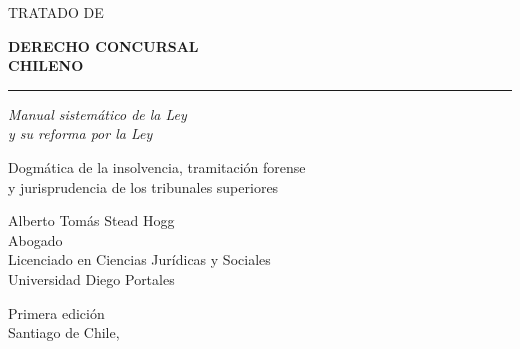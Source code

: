 \begin{titlingpage}
\begin{center}
\vspace*{2.2cm}

{\sffamily\large\color{ColorGris} TRATADO DE}

\vspace{0.4cm}
{\sffamily\HUGE\bfseries\color{ColorTinta} DERECHO CONCURSAL\\[6pt] CHILENO}

\vspace{0.9cm}
{\color{ColorBorde}\rule{0.62\textwidth}{0.8pt}}

\vspace{0.9cm}
{\large\itshape Manual sistemático de la Ley \\[4pt]
y su reforma por la Ley }

\vspace{1.6cm}
{\sffamily\normalsize\color{ColorGris}
Dogmática de la insolvencia, tramitación forense\\[3pt]
y jurisprudencia de los tribunales superiores}

\vfill

{\large\sffamily Alberto Tomás Stead Hogg}\\[4pt]
{\small\color{ColorGris} Abogado\\
Licenciado en Ciencias Jurídicas y Sociales\\
Universidad Diego Portales}

\vspace{1.4cm}
{\small\sffamily\color{ColorGris} Primera edición\\ Santiago de Chile, \the\year}

\vspace*{1.2cm}
\end{center}
\end{titlingpage}

